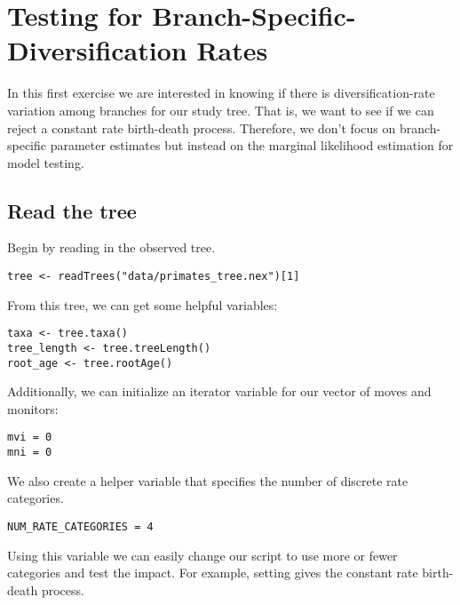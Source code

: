 \bigskip
\section{Testing for Branch-Specific-Diversification Rates}

In this first exercise we are interested in knowing if there is diversification-rate variation among branches for our study tree.
That is, we want to see if we can reject a constant rate birth-death process.
Therefore, we don't focus on branch-specific parameter estimates but instead on the marginal likelihood estimation for model testing.



\subsection{Read the tree}

Begin by reading in the observed tree.

{\tt \begin{snugshade*}
\begin{lstlisting}
tree <- readTrees("data/primates_tree.nex")[1]
\end{lstlisting}
\end{snugshade*}}

From this tree, we can get some helpful variables:
{\tt \begin{snugshade*}
\begin{lstlisting}
taxa <- tree.taxa()
tree_length <- tree.treeLength()
root_age <- tree.rootAge()
\end{lstlisting}
\end{snugshade*}}

Additionally, we can initialize an iterator variable for our vector of moves and monitors:
{\tt \begin{snugshade*}
\begin{lstlisting}
mvi = 0
mni = 0
\end{lstlisting}
\end{snugshade*}}

We also create a helper variable that specifies the number of discrete rate categories.
{\tt \begin{snugshade*}
\begin{lstlisting}
NUM_RATE_CATEGORIES = 4
\end{lstlisting}
\end{snugshade*}}
Using this variable we can easily change our script to use more or fewer categories and test the impact.
For example, setting  gives the constant rate birth-death process.

